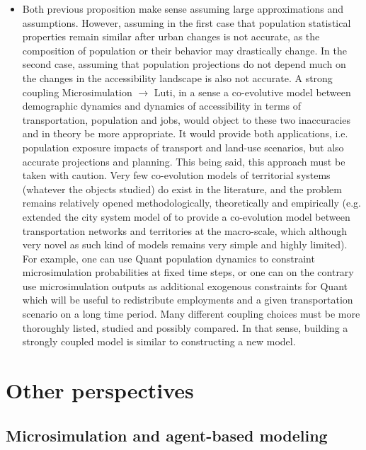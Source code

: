 \begin{itemize}
	\item Both previous proposition make sense assuming large approximations and assumptions. However, assuming in the first case that population statistical properties remain similar after urban changes is not accurate, as the composition of population or their behavior may drastically change. In the second case, assuming that population projections do not depend much on the changes in the accessibility landscape is also not accurate. A strong coupling Microsimulation $\rightarrow$ Luti, in a sense a co-evolutive model between  demographic dynamics and dynamics of accessibility in terms of transportation, population and jobs, would object to these two inaccuracies and in theory be more appropriate. It would provide both applications, i.e. population exposure impacts of transport and land-use scenarios, but also accurate projections and planning. This being said, this approach must be taken with caution. Very few co-evolution models of territorial systems (whatever the objects studied) do exist in the literature, and the problem remains relatively opened methodologically, theoretically and empirically (e.g. \cite{raimbault2018modeling} extended the city system model of \cite{raimbault2018indirect} to provide a co-evolution model between transportation networks and territories at the macro-scale, which although very novel as such kind of models remains very simple and highly limited). For example, one can use Quant population dynamics to constraint microsimulation probabilities at fixed time steps, or one can on the contrary use microsimulation outputs as additional exogenous constraints for Quant which will be useful to redistribute employments and a given transportation scenario on a long time period. Many different coupling choices must be more thoroughly listed, studied and possibly compared. In that sense, building a strongly coupled model is similar to constructing a new model.
\end{itemize}


\section{Other perspectives}


\subsection{Microsimulation and agent-based modeling}

